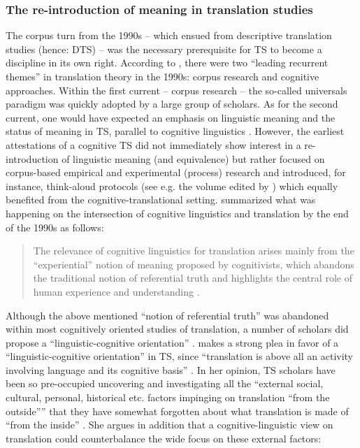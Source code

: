 \subsubsection{The re-introduction of meaning in translation studies}
\label{sec:2.2.3.2}  
The corpus turn from the 1990s – which ensued from descriptive translation studies (hence: DTS) – was the necessary prerequisite for TS to become a discipline in its own right. According to \citet[41]{thelen_translation_2002}, there were two “leading recurrent themes” in translation theory in the 1990s: corpus research and cognitive approaches. Within the first current – corpus research – the so-called universals paradigm was quickly adopted by a large group of scholars. As for the second current, one would have expected an emphasis on linguistic meaning and the status of meaning in TS, parallel to cognitive linguistics \citep[41]{thelen_translation_2002}. However, the earliest attestations of a cognitive TS did not immediately show interest in a re-introduction of linguistic meaning (and equivalence) but rather focused on corpus-based empirical and experimental (process) research and introduced, for instance, think-aloud protocols (see e.g. the volume edited by \citealt{tirkkonen-condit_tapping_2000}) which equally benefited from the cognitive-translational setting. \citet{rojo_cognitive_2013} summarized what was happening on the intersection of cognitive linguistics and translation by the end of the 1990s as follows:

\begin{quote}
The relevance of cognitive linguistics for translation arises mainly from the “experiential” notion of meaning proposed by cognitivists, which abandons the traditional notion of referential truth and highlights the central role of human experience and understanding \citep[7]{rojo_cognitive_2013}.
\end{quote}

Although the above mentioned “notion of referential truth” was abandoned within most cognitively oriented studies of translation, a number of scholars did propose a “linguistic-cognitive orientation” \citep{house_towards_2013}. \citet{house_towards_2013} makes a strong plea in favor of a “linguistic-cognitive orientation” in TS, since “translation is above all an activity involving language and its cognitive basis” \citep[47]{house_towards_2013}. In her opinion, TS scholars have been so pre-occupied uncovering and investigating all the “external social, cultural, personal, historical etc. factors impinging on translation ``from the outside''{”} that they have somewhat forgotten about what translation is made of ``from the inside'' \citep[47]{house_towards_2013}. She argues in addition that a cognitive-linguistic view on translation could counterbalance the wide focus on these external factors:

